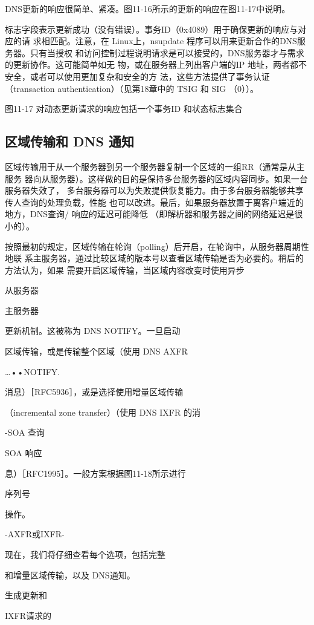 DNS更新的响应很简单、紧凑。图11-16所示的更新的响应在图11-17中说明。

标志字段表示更新成功（没有错误）。事务ID（0x4089）用于确保更新的响应与对应的请
求相匹配。注意，在 Linux上，nsupdate 程序可以用来更新合作的DNS服务器。只有当授权
和访问控制过程说明请求是可以接受的，DNS服务器才与需求的更新协作。这可能简单如无
物，或在服务器上列出客户端的IP 地址，两者都不安全，或者可以使用更加复杂和安全的方
法，这些方法提供了事务认证 （transaction authentication）（见第18章中的 TSIG 和 SIG （0））。

图11-17 对动态更新请求的响应包括一个事务ID 和状态标志集合

\subsection{区域传输和 DNS 通知}

区域传输用于从一个服务器到另一个服务器复制一个区域的一组RR（通常是从主服务
器向从服务器）。这样做的目的是保持多台服务器的区域内容同步。如果一台服务器失效了，
多台服务器可以为失败提供恢复能力。由于多台服务器能够共享传人查询的处理负载，性能
也可以改进。最后，如果服务器放置于离客户端近的地方，DNS查询/ 响应的延迟可能降低
（即解析器和服务器之间的网络延迟是很小的）。

按照最初的规定，区域传输在轮询（polling）后开启，在轮询中，从服务器周期性地联
系主服务器，通过比较区域的版本号以查看区域传输是否为必要的。稍后的方法认为，如果
需要开启区域传输，当区域内容改变时使用异步

从服务器

主服务器

更新机制。这被称为 DNS NOTIFY。一旦启动

区域传输，或是传输整个区域（使用 DNS AXFR

…••NOTIFY.

消息）［RFC5936］，或是选择使用增量区域传输

（incremental zone transfer）（使用 DNS IXFR 的消

-SOA 查询

SOA 响应

息）［RFC1995］。一般方案根据图11-18所示进行

序列号

操作。

-AXFR或IXFR-

现在，我们将仔细查看每个选项，包括完整

和增量区域传输，以及 DNS通知。

生成更新和

IXFR请求的


